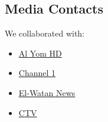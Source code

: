 \documentclass[11pt, twocolumn]{article}
\begin{document}
\subsection{Media Contacts}
We collaborated with:
\begin{itemize}
    \item \href{https://www.facebook.com/E-JUST.official/videos/3449961901956390/}{Al Yom HD}
    \item \href{https://www.facebook.com/Channel1/videos/555933573138009/}{Channel 1}
    \item \href{https://www.facebook.com/ElWatanNews/videos/176552042188662}{El-Watan News}
    \item \href{https://www.facebook.com/watch/?mibextid=6p5qLk&v=1074663143567405}{CTV}
    
\end{itemize}
\end{document}
